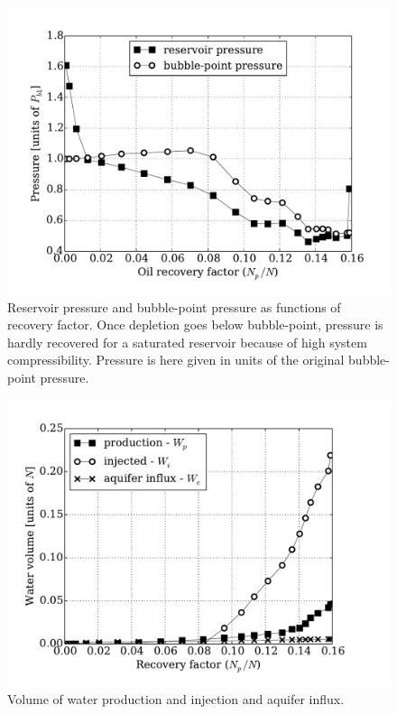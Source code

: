 \documentclass[authoryear,preprint,review,11pt]{elsarticle}
\begin{document}
\pagebreak

\begin{figure}
\centering
\includegraphics[width=\linewidth]{./python/matbal_p}
\caption{Reservoir pressure and bubble-point pressure as functions of recovery factor. Once depletion goes below bubble-point, pressure is hardly recovered for a saturated reservoir because of high system compressibility. Pressure is here given in units of the original bubble-point pressure.}
\label{fig: matbal_p}
\end{figure}

\begin{figure}
\centering
\includegraphics[width=\linewidth]{./python/matbal_water}
\caption{Volume of water production and injection and aquifer influx.}
\label{fig: matbal_water}
\end{figure}
\end{document}

